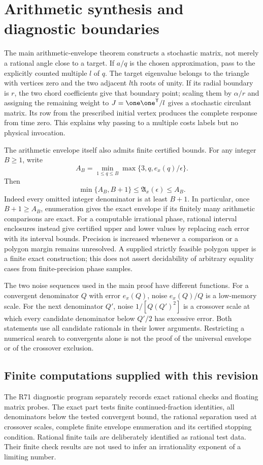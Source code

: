 \section{Arithmetic synthesis and diagnostic boundaries}\label{sec:supp-r71}
The main arithmetic-envelope theorem constructs a stochastic matrix, not merely a rational angle close to a target. If $a/q$ is the chosen approximation, pass to the explicitly counted multiple $l$ of $q$. The target eigenvalue belongs to the triangle with vertices zero and the two adjacent $l$th roots of unity. If its radial boundary is $r$, the two chord coefficients give that boundary point; scaling them by $\alpha/r$ and assigning the remaining weight to $J=\one\one^{\mathsf T}/l$ gives a stochastic circulant matrix. Its row from the prescribed initial vertex produces the complete response from time zero. This explains why passing to a multiple costs labels but no physical invocation.

The arithmetic envelope itself also admits finite certified bounds. For any integer $B\ge1$, write
\[
 A_B=\min_{1\le q\le B}\max\{3,q,e_x(q)/\epsilon\}.
\]
Then
\begin{equation}\label{eq:supp-r71-enumeration}
 \min\{A_B,B+1\}\le\mathfrak A_x(\epsilon)\le A_B.
\end{equation}
Indeed every omitted integer denominator is at least $B+1$. In particular, once $B+1\ge A_B$, enumeration gives the exact envelope if its finitely many arithmetic comparisons are exact. For a computable irrational phase, rational interval enclosures instead give certified upper and lower values by replacing each error with its interval bounds. Precision is increased whenever a comparison or a polygon margin remains unresolved. A supplied strictly feasible polygon upper is a finite exact construction; this does not assert decidability of arbitrary equality cases from finite-precision phase samples.

The two noise sequences used in the main proof have different functions. For a convergent denominator $Q$ with error $e_x(Q)$, noise $e_x(Q)/Q$ is a low-memory scale. For the next denominator $Q'$, noise $1/[Q(Q')^2]$ is a crossover scale at which every candidate denominator below $Q'/2$ has excessive error. Both statements use all candidate rationals in their lower arguments. Restricting a numerical search to convergents alone is not the proof of the universal envelope or of the crossover exclusion.

\subsection{Finite computations supplied with this revision}
The R71 diagnostic program separately records exact rational checks and floating matrix probes. The exact part tests finite continued-fraction identities, all denominators below the tested convergent bound, the rational separation used at crossover scales, complete finite envelope enumeration and its certified stopping condition. Rational finite tails are deliberately identified as rational test data. Their finite check results are not used to infer an irrationality exponent of a limiting number.

